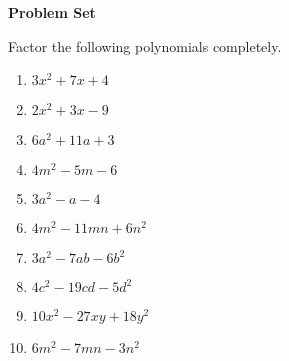 \textbf{Problem Set}

\vspce

Factor the following polynomials completely.  
\begin{enumerate} 


\item \hspce $3x^{2} + 7x + 4 $
\item \hspce $2x^{2} + 3x - 9$
\item \hspce $6a^{2} + 11a + 3		$
\item \hspce $4m^{2} - 5m - 6$
\item \hspce $3a^{2} - a - 4$
\item \hspce $4 m^{2} - 11 m n + 6 n^{2} $

\item \hspce $ 3 a^{2} - 7 a b - 6 b^{2}$

\item \hspce $ 4 c^{2} - 19 c d - 5 d^{2}$

\item \hspce $10 x^{2} - 27 x y + 18 y^{2} $

\item \hspce $6 m^{2} - 7 m n - 3 n^{2} $

 
\end{enumerate}